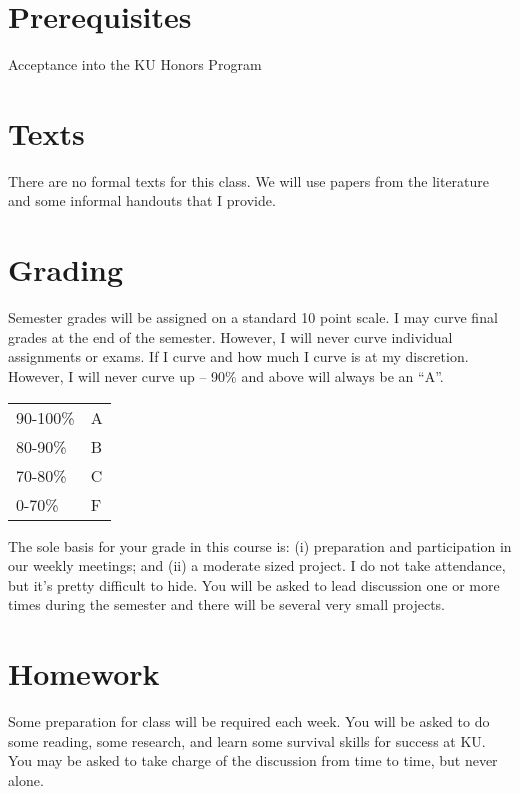 \documentclass{tufte-handout}
\begin{document}
\section{Prerequisites}

Acceptance into the KU Honors Program

\section{Texts}

There are no formal texts for this class.  We will use papers from the
literature and some informal handouts that I provide.

\section{Grading}

Semester grades will be assigned on a standard 10 point scale.  I may
curve final grades at the end of the semester.  However, I will never
curve individual assignments or exams.  If I curve and how much I
curve is at my discretion.  However, I will never curve up -- 90\% and
above will always be an ``A''.
\begin{margintable}
  \begin{tabular}{ll}
    90-100\% & A \\
    80-90\% & B \\
    70-80\% & C \\
    0-70\% & F \\
  \end{tabular}
\end{margintable}

The sole basis for your grade in this course is: (i) preparation and
participation in our weekly meetings; and (ii) a moderate sized
project.  I do not take attendance, but it's pretty difficult to hide.
You will be asked to lead discussion one or more times during the
semester and there will be several very small projects.

\section{Homework}

Some preparation for class will be required each week.  You will be
asked to do some reading, some research, and learn some survival
skills for success at KU.  You may be asked to take charge of the
discussion from time to time, but never alone.
\end{document}
